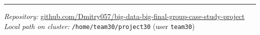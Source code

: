 \documentclass[11pt,a4paper]{article}
\begin{document}
\vspace{1cm}
\hrule
\vspace{0.4cm}
\begin{center}
\small
\textit{Repository:}
\href{https://github.com/Dmitry057/big-data-big-final-group-case-study-project}%
{github.com/Dmitry057/big-data-big-final-group-case-study-project} \\
\textit{Local path on cluster:} \texttt{/home/team30/project30} (user \texttt{team30})
\end{center}
\end{document}
